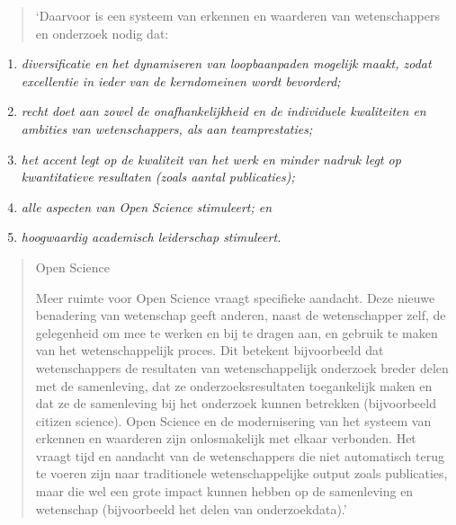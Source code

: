 \documentclass[smallauthor, chapterhaspagenum, nochapterinheader, pagenuminheader,  bigchapnum,medium2, tocpages,  garamond, titleinheader]{jote-book}
\begin{document}
	\begin{quote}
		\itshape

		‘Daarvoor is een systeem van erkennen en waarderen van wetenschappers en onderzoek nodig dat:
	\end{quote}
	\begin{enumerate}


		\item \emph{diversificatie en het dynamiseren van loopbaanpaden mogelijk maakt, zodat excellentie in ieder van de kerndomeinen wordt bevorderd;}



		\item
		\emph{recht doet aan zowel de onafhankelijkheid en de individuele kwaliteiten en ambities van wetenschappers, als aan teamprestaties; }



		\item \emph{het accent legt op de kwaliteit van het werk en minder nadruk legt op kwantitatieve resultaten (zoals aantal publicaties); }



		\item \emph{alle aspecten van Open }\emph{Science}\emph{ stimuleert; en }



		\item \emph{hoogwaardig academisch leiderschap stimuleert.}


	\end{enumerate}
	\begin{quote}
		\itshape

		Open Science

		\vspace*{\baselineskip}

		Meer ruimte voor Open Science vraagt specifieke aandacht. Deze nieuwe benadering van wetenschap geeft anderen, naast de wetenschapper zelf, de gelegenheid om mee te werken en bij te dragen aan, en gebruik te maken van het wetenschappelijk proces. Dit betekent bijvoorbeeld dat wetenschappers de resultaten van wetenschappelijk onderzoek breder delen met de samenleving, dat ze onderzoeksresultaten toegankelijk maken en dat ze de samenleving bij het onderzoek kunnen betrekken (bijvoorbeeld citizen science). Open Science en de modernisering van het systeem van erkennen en waarderen zijn onlosmakelijk met elkaar verbonden. Het vraagt tijd en aandacht van de wetenschappers die niet automatisch terug te voeren zijn naar traditionele wetenschappelijke output zoals publicaties, maar die wel een grote impact kunnen hebben op de samenleving en wetenschap (bijvoorbeeld het delen van onderzoekdata).'
	\end{quote}
\end{document}
